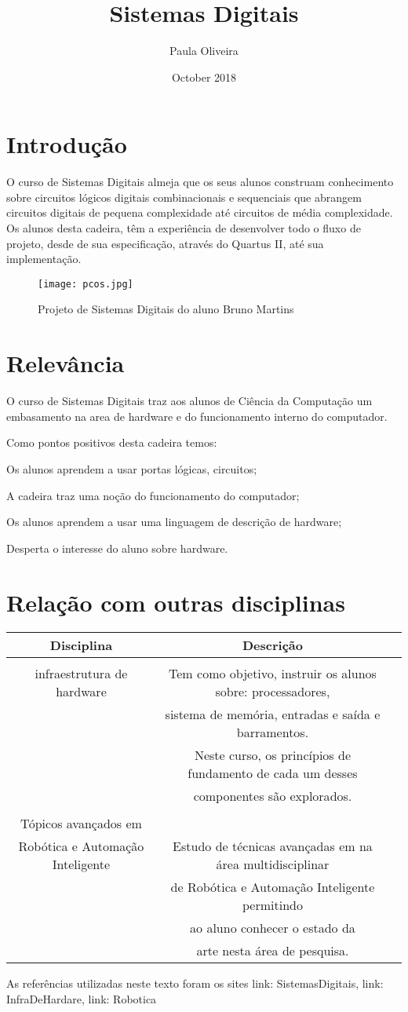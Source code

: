 \documentclass{article}[10pt]
\title{Sistemas Digitais}
\author{Paula Oliveira}
\date{October 2018}
\begin{document}
\maketitle

\section{Introdução}
O curso de Sistemas Digitais almeja que os seus alunos construam conhecimento sobre circuitos lógicos digitais combinacionais e sequenciais que abrangem circuitos digitais de pequena complexidade até circuitos de média complexidade. Os alunos desta cadeira, têm a experiência de desenvolver todo o fluxo de projeto, desde de sua especificação, através do Quartus II, até sua implementação.

\begin{figure}[h!]
\centering
\texttt{[image: pcos.jpg]}
\caption{Projeto de Sistemas Digitais do aluno Bruno Martins}
\label{fig:universe}
\end{figure}

\section{Relevância}
O curso de Sistemas Digitais traz aos alunos de Ciência da Computação um embasamento na area de hardware e do funcionamento interno do computador.

Como pontos positivos desta cadeira temos:

Os alunos aprendem a usar portas lógicas, circuitos;

A cadeira traz uma noção do funcionamento do computador;

Os alunos aprendem a usar uma linguagem de descrição de hardware;

Desperta o interesse do aluno sobre hardware.

 
 
 \section{Relação com outras disciplinas}
 \begin{tabular}{c|cl}

  Disciplina   & Descrição \\\hline
  \\
   infraestrutura de hardware  & Tem como objetivo, instruir os alunos sobre: processadores, \\& sistema de memória, entradas e saída e barramentos. \\&  Neste curso, os princípios de fundamento de cada um desses \\& componentes são explorados. \\\hline
   \\
   Tópicos avançados em \\Robótica e Automação Inteligente &  Estudo de técnicas avançadas em na área multidisciplinar \\& de Robótica e Automação Inteligente permitindo \\& ao aluno conhecer o estado da\\& arte nesta área de pesquisa.
\end{tabular}



    As referências utilizadas neste texto foram os sites {link: SistemasDigitais}, {link: InfraDeHardare}, {link: Robotica}
\end{document}
